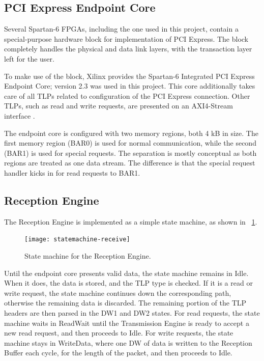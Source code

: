 \subsection{PCI Express Endpoint Core}

Several Spartan-6 FPGAs, including the one used in this project, contain a special-purpose hardware block for implementation of PCI Express.
The block completely handles the physical and data link layers, with the transaction layer left for the user.

To make use of the block, Xilinx provides the Spartan-6 Integrated PCI Express Endpoint Core; version 2.3 was used in this project.
This core additionally takes care of all TLPs related to configuration of the PCI Express connection.
Other TLPs, such as read and write requests, are presented on an AXI4-Stream interface \cite{ug672}.

The endpoint core is configured with two memory regions, both 4 kB in size\footnotemark.
The first memory region (BAR0) is used for normal communication, while the second (BAR1) is used for special requests.
The separation is mostly conceptual as both regions are treated as one data stream.
The difference is that the special request handler kicks in for read requests to BAR1.

\subsection{Reception Engine}

The Reception Engine is implemented as a simple state machine, as shown in \figurename~\ref{fig:statemachine-receive}.

\begin{figure}[!ht]
    \centering
    \texttt{[image: statemachine-receive]}
    \caption[Reception Engine state machine]{
        State machine for the Reception Engine.
    }
    \label{fig:statemachine-receive}
\end{figure}

Until the endpoint core presents valid data, the state machine remains in Idle.
When it does, the data is stored, and the TLP type is checked.
If it is a read or write request, the state machine continues down the corresponding path, otherwise the remaining data is discarded.
The remaining portion of the TLP headers are then parsed in the DW1 and DW2 states.
For read requests, the state machine waits in ReadWait until the Transmission Engine is ready to accept a new read request, and then proceeds to Idle.
For write requests, the state machine stays in WriteData, where one DW of data is written to the Reception Buffer each cycle, for the length of the packet, and then proceeds to Idle.

